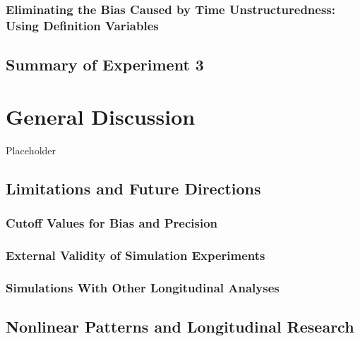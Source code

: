 \documentclass[
12pt, %
twoside,
english]{guelphthesis}
\begin{document}
\hypertarget{def-variables}{%
\subsection{Eliminating the Bias Caused by Time Unstructuredness: Using Definition Variables}\label{def-variables}}

\hypertarget{summary-of-experiment-3}{%
\section{Summary of Experiment 3}\label{summary-of-experiment-3}}

\hypertarget{general-discussion}{%
\chapter{General Discussion}\label{general-discussion}}

Placeholder

\hypertarget{limitations-and-future-directions}{%
\section{Limitations and Future Directions}\label{limitations-and-future-directions}}

\hypertarget{cutoff-values-for-bias-and-precision}{%
\subsection{Cutoff Values for Bias and Precision}\label{cutoff-values-for-bias-and-precision}}

\hypertarget{external-validity-of-simulation-experiments}{%
\subsection{External Validity of Simulation Experiments}\label{external-validity-of-simulation-experiments}}

\hypertarget{simulations-with-other-longitudinal-analyses}{%
\subsection{Simulations With Other Longitudinal Analyses}\label{simulations-with-other-longitudinal-analyses}}

\hypertarget{nonlinear-patterns-and-longitudinal-research}{%
\section{Nonlinear Patterns and Longitudinal Research}\label{nonlinear-patterns-and-longitudinal-research}}
\end{document}
